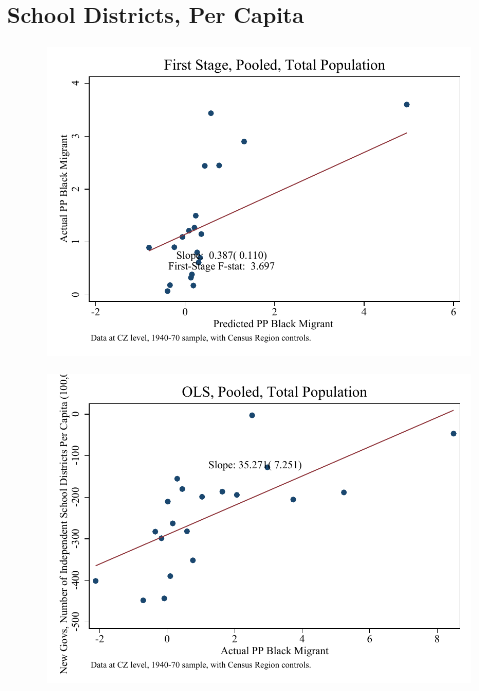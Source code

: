 \documentclass{article}
\begin{document}
\subsection{School Districts, Per Capita}

\clearpage
\begin{figure}
\centering
\includegraphics{figures/simplefigs/pooled_schdist_ind_pc_C3_total_fs.pdf}
\end{figure}
\clearpage
\begin{figure}
\centering
\includegraphics{figures/simplefigs/pooled_schdist_ind_pc_C3_total_ols.pdf}
\end{figure}
\clearpage
\end{document}
